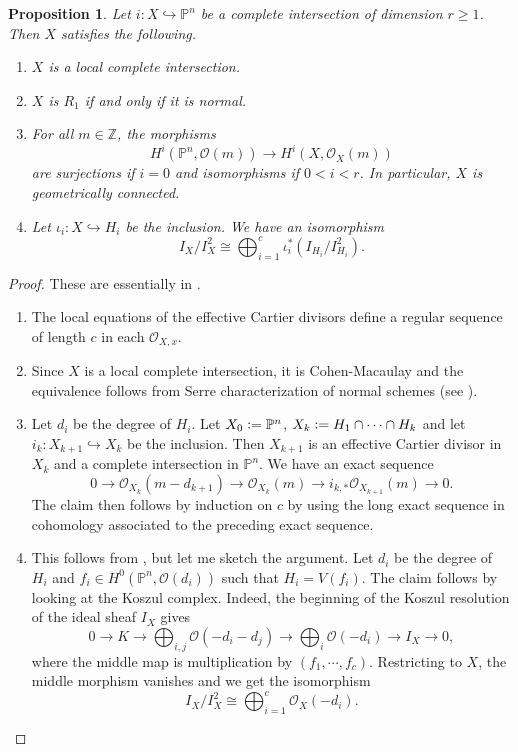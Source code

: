 \documentclass[a4paper,12pt]{amsart}
\newtheorem{proposition}[definition]{Proposition}
\numberwithin{equation}{section}
\newcommand{\defeq}{\vcentcolon=}
\renewcommand{\geq}{\geqslant}
\renewcommand{\_}{\rule{0.25cm}{0.4pt}}
\begin{document}
\begin{proposition}\label{propriedades intersecoes completas}
    Let $i\colon X\hookrightarrow \mathbb{P}^{n}$ be a complete intersection of dimension $r\geq 1$. Then $X$ satisfies the following.
    \begin{enumerate}
        \item $X$ is a local complete intersection.
        \item $X$ is $R_{1}$ if and only if it is normal.
        \item For all $m\in \mathbb{Z}$, the morphisms
        \[
        H^{i}(\mathbb{P}^{n},\mathcal{O}(m))\to H^{i}(X,\mathcal{O}_{X}(m))
        \]
        are surjections if $i=0$ and isomorphisms if $0<i<r$. In particular, $X$ is geometrically connected.
        \item Let $\iota_{i}\colon X\hookrightarrow H_{i}$ be the inclusion. We have an isomorphism
        \[
        I_{X}/I_{X}^{2}\cong\bigoplus_{i=1}^{c}\iota_{i}^{\ast}(I_{H_{i}}/I_{H_{i}}^{2}).
        \]
    \end{enumerate}
\end{proposition}
\begin{proof}
    These are essentially in \cite[Chapter III, Ex. 5.5]{hartshorne}.
    \begin{enumerate}
        \item The local equations of the effective Cartier divisors define a regular sequence of length $c$ in each $\mathcal{O}_{X,x}$.
        \item Since $X$ is a local complete intersection, it is Cohen-Macaulay and the equivalence follows from Serre characterization of normal schemes (see \cite[\href{https://stacks.math.columbia.edu/tag/033P}{Tag 033P}]{stacks-project}).
        \item Let $d_{i}$ be the degree of $H_{i}$. Let $X_{0}\defeq \mathbb{P}^{n}$, $X_{k}\defeq H_{1}\cap\dots\cap H_{k}$ and let $i_{k}\colon X_{k+1}\hookrightarrow X_{k}$ be the inclusion. Then $X_{k+1}$ is an effective Cartier divisor in $X_{k}$ and a complete intersection in $\mathbb{P}^{n}$. We have an exact sequence
        \[
        0\to \mathcal{O}_{X_{k}}(m-d_{k+1})\to \mathcal{O}_{X_{k}}(m)\to i_{k,\ast}\mathcal{O}_{X_{k+1}}(m)\to 0.
        \]
        The claim then follows by induction on $c$ by using the long exact sequence in cohomology associated to the preceding exact sequence.
        \item This follows from \cite[Proposition 19.27]{Grtz2023}, but let me sketch the argument. Let $d_{i}$ be the degree of $H_{i}$ and $f_{i}\in H^{0}(\mathbb{P}^{n},\mathcal{O}(d_{i}))$ such that $H_{i}=V(f_{i})$. The claim follows by looking at the Koszul complex. Indeed, the beginning of the Koszul resolution of the ideal sheaf $I_{X}$ gives
        \[
        0\to K\to \bigoplus_{i,j}\mathcal{O}(-d_{i}-d_{j})\to \bigoplus_{i}\mathcal{O}(-d_{i})\to I_{X}\to 0,
        \]
        where the middle map is multiplication by $(f_{1},\cdots, f_{c})$. Restricting to $X$, the middle morphism vanishes and we get the isomorphism
        \[
        I_{X}/I_{X}^{2}\cong\bigoplus_{i=1}^{c}\mathcal{O}_{X}(-d_{i}).
        \]
    \end{enumerate}
\end{proof}
\end{document}
